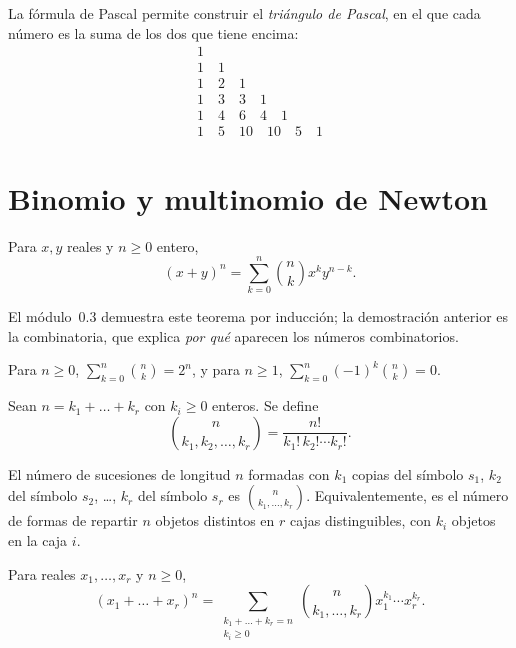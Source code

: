 La fórmula de Pascal permite construir el \emph{triángulo de Pascal}, en el que cada número es la suma de los dos que tiene encima:
\[
\begin{array}{c}
1\\
1\quad 1\\
1\quad 2\quad 1\\
1\quad 3\quad 3\quad 1\\
1\quad 4\quad 6\quad 4\quad 1\\
1\quad 5\quad 10\quad 10\quad 5\quad 1
\end{array}
\]

\section{Binomio y multinomio de Newton}

\begin{teorema}\label{teo:t2-binomio}
Para $x,y$ reales y $n\ge0$ entero,
\[
(x+y)^{n}=\sum_{k=0}^{n}\binom{n}{k}x^{k}y^{n-k}.
\]
\end{teorema}

El módulo~0.3 demuestra este teorema por inducción; la demostración anterior es la combinatoria, que explica \emph{por qué} aparecen los números combinatorios.

\begin{corolario}\label{cor:t2-sumas}
Para $n\ge 0$, $\sum_{k=0}^{n}\binom{n}{k}=2^{n}$, y para $n\ge1$, $\sum_{k=0}^{n}(-1)^{k}\binom{n}{k}=0$.
\end{corolario}

\begin{definicion}
Sean $n=k_1+\dots+k_r$ con $k_i\ge0$ enteros. Se define
\[
\binom{n}{k_1,k_2,\dots,k_r}=\frac{n!}{k_1!\,k_2!\cdots k_r!}.
\]
\end{definicion}

\begin{teorema}\label{teo:t2-multinomial}
El número de sucesiones de longitud $n$ formadas con $k_1$ copias del símbolo $s_1$, $k_2$ del símbolo $s_2$, \dots, $k_r$ del símbolo $s_r$ es $\binom{n}{k_1,\dots,k_r}$. Equivalentemente, es el número de formas de repartir $n$ objetos distintos en $r$ cajas distinguibles, con $k_i$ objetos en la caja $i$.
\end{teorema}

\addtocounter{definicion}{1}%

\begin{teorema}\label{teo:t2-multinomio}
Para reales $x_1,\dots,x_r$ y $n\ge0$,
\[
(x_1+\dots+x_r)^{n}=\sum_{\substack{k_1+\dots+k_r=n\\ k_i\ge0}}\binom{n}{k_1,\dots,k_r}x_1^{k_1}\cdots x_r^{k_r}.
\]
\end{teorema}

